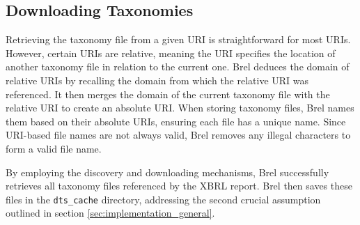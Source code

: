 
\subsection{Downloading Taxonomies}

Retrieving the taxonomy file from a given URI is straightforward for most URIs.
However, certain URIs are relative,
meaning the URI specifies the location of another taxonomy file in relation to the current one\cite{w3_relative_uri}.
Brel deduces the domain of relative URIs by recalling the domain from which the relative URI was referenced.
It then merges the domain of the current taxonomy file with the relative URI to create an absolute URI.
When storing taxonomy files, Brel names them based on their absolute URIs, ensuring each file has a unique name.
Since URI-based file names are not always valid, Brel removes any illegal characters to form a valid file name.

By employing the discovery and downloading mechanisms,
Brel successfully retrieves all taxonomy files referenced by the XBRL report.
Brel then saves these files in the \texttt{dts\_cache} directory,
addressing the second crucial assumption outlined in section \ref{sec:implementation_general}.
